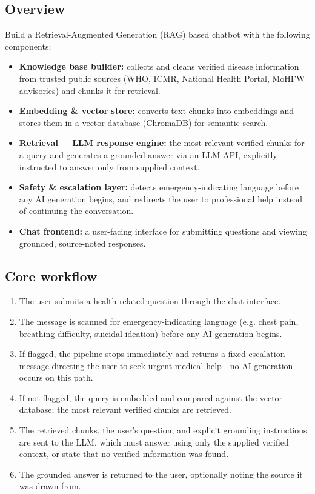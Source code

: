 \documentclass[11pt,a4paper]{article}
\begin{document}
\subsection{Overview}
Build a Retrieval-Augmented Generation (RAG) based chatbot with the following components:
\begin{itemize}
    \item \textbf{Knowledge base builder:} collects and cleans verified disease information from trusted public sources (WHO, ICMR, National Health Portal, MoHFW advisories) and chunks it for retrieval.
    \item \textbf{Embedding \& vector store:} converts text chunks into embeddings and stores them in a vector database (ChromaDB) for semantic search.
    \item \textbf{Retrieval + LLM response engine:} the most relevant verified chunks for a query and generates a grounded answer via an LLM API, explicitly instructed to answer only from supplied context.
    \item \textbf{Safety \& escalation layer:} detects emergency-indicating language before any AI generation begins, and redirects the user to professional help instead of continuing the conversation.
    \item \textbf{Chat frontend:} a user-facing interface for submitting questions and viewing grounded, source-noted responses.
\end{itemize}

\subsection{Core workflow}
\begin{enumerate}
    \item The user submits a health-related question through the chat interface.
    \item The message is scanned for emergency-indicating language (e.g. chest pain, breathing difficulty, suicidal ideation) before any AI generation begins.
    \item If flagged, the pipeline stops immediately and returns a fixed escalation message directing the user to seek urgent medical help - no AI generation occurs on this path.
    \item If not flagged, the query is embedded and compared against the vector database; the most relevant verified chunks are retrieved.
    \item The retrieved chunks, the user's question, and explicit grounding instructions are sent to the LLM, which must answer using only the supplied verified context, or state that no verified information was found.
    \item The grounded answer is returned to the user, optionally noting the source it was drawn from.
\end{enumerate}
\end{document}
